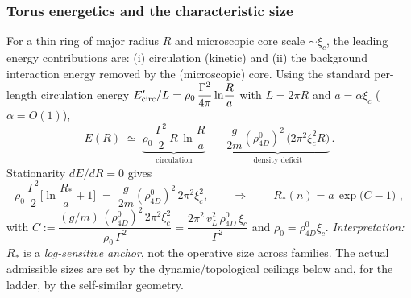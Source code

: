 \subsubsection{Torus energetics and the characteristic size}
For a thin ring of major radius \(R\) and microscopic core scale \(\sim\xi_c\), the leading energy contributions are:
(i) circulation (kinetic) and (ii) the background interaction energy removed by the (microscopic) core. Using the standard per-length circulation energy \(E'_{\rm circ}/L=\rho_0\,\dfrac{\Gamma^2}{4\pi}\ln\!\dfrac{R}{a}\) with \(L=2\pi R\) and \(a=\alpha\xi_c\) (\(\alpha=O(1)\)),
\begin{equation}
E(R)\;\simeq\;
\underbrace{\rho_0\,\frac{\Gamma^2}{2}\,R\,\ln\!\frac{R}{a}}_{\text{circulation}}
\;-\;
\underbrace{\frac{g}{2m}(\rho_{4D}^0)^2\,\big(2\pi^2\xi_c^2R\big)}_{\text{density deficit}}\,.
\label{eq:EofR}
\end{equation}
Stationarity \(dE/dR=0\) gives
\begin{equation}
\rho_0\,\frac{\Gamma^2}{2}\Big[\ln\!\frac{R_*}{a}+1\Big]\;=\;\frac{g}{2m}(\rho_{4D}^0)^2\,2\pi^2\xi_c^2,
\qquad\Rightarrow\qquad
\boxed{\,R_*(n)=a\,\exp\!\Big(C-1\Big)\,}\,,
\label{eq:Rstar}
\end{equation}
with
\(
C:=\dfrac{(g/m)\,(\rho_{4D}^0)^2\,2\pi^2\xi_c^2}{\rho_0\,\Gamma^2}
=\dfrac{2\pi^2\,v_L^2\,\rho_{4D}^0\,\xi_c}{\Gamma^2}
\)
and \(\rho_0=\rho_{4D}^0\xi_c\).
\emph{Interpretation:} \(R_*\) is a \emph{log-sensitive anchor}, not the operative size across families. The actual admissible sizes are set by the dynamic/topological ceilings below and, for the ladder, by the self-similar geometry.

